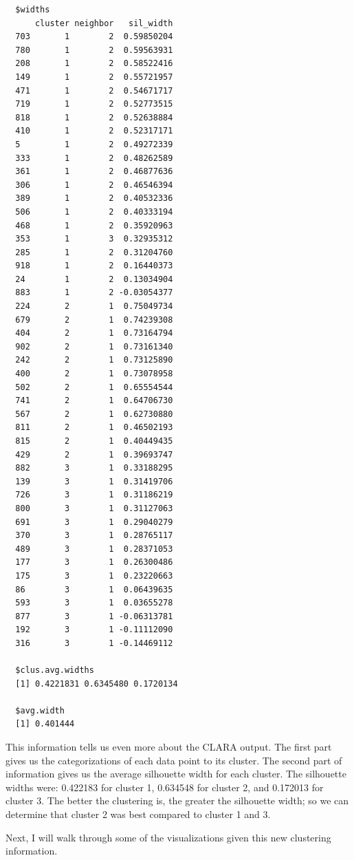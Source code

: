 \documentclass[12pt,twoside]{amherstthesis}
\begin{document}
  \begin{verbatim}
  $widths
      cluster neighbor   sil_width
  703       1        2  0.59850204
  780       1        2  0.59563931
  208       1        2  0.58522416
  149       1        2  0.55721957
  471       1        2  0.54671717
  719       1        2  0.52773515
  818       1        2  0.52638884
  410       1        2  0.52317171
  5         1        2  0.49272339
  333       1        2  0.48262589
  361       1        2  0.46877636
  306       1        2  0.46546394
  389       1        2  0.40532336
  506       1        2  0.40333194
  468       1        2  0.35920963
  353       1        3  0.32935312
  285       1        2  0.31204760
  918       1        2  0.16440373
  24        1        2  0.13034904
  883       1        2 -0.03054377
  224       2        1  0.75049734
  679       2        1  0.74239308
  404       2        1  0.73164794
  902       2        1  0.73161340
  242       2        1  0.73125890
  400       2        1  0.73078958
  502       2        1  0.65554544
  741       2        1  0.64706730
  567       2        1  0.62730880
  811       2        1  0.46502193
  815       2        1  0.40449435
  429       2        1  0.39693747
  882       3        1  0.33188295
  139       3        1  0.31419706
  726       3        1  0.31186219
  800       3        1  0.31127063
  691       3        1  0.29040279
  370       3        1  0.28765117
  489       3        1  0.28371053
  177       3        1  0.26300486
  175       3        1  0.23220663
  86        3        1  0.06439635
  593       3        1  0.03655278
  877       3        1 -0.06313781
  192       3        1 -0.11112090
  316       3        1 -0.14469112
  
  $clus.avg.widths
  [1] 0.4221831 0.6345480 0.1720134
  
  $avg.width
  [1] 0.401444
  \end{verbatim}
  
  This information tells us even more about the CLARA output. The first
  part gives us the categorizations of each data point to its cluster. The
  second part of information gives us the average silhouette width for
  each cluster. The silhouette widths were: 0.422183 for cluster 1,
  0.634548 for cluster 2, and 0.172013 for cluster 3. The better the
  clustering is, the greater the silhouette width; so we can determine
  that cluster 2 was best compared to cluster 1 and 3.
  
  Next, I will walk through some of the visualizations given this new
  clustering information.
  
\end{document}
